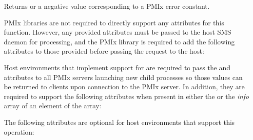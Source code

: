 Returns  or a negative value corresponding to a PMIx error constant.

\reqattrstart
\ac{PMIx} libraries are not required to directly support any attributes for this function. However, any provided attributes must be passed to the host \ac{SMS} daemon for processing, and the \ac{PMIx} library is required to add the following attributes to those provided before passing the request to the host:


\divider

Host environments that implement support for  are required to pass the  and  attributes to all \ac{PMIx} servers launching new child processes so those values can be returned to clients upon connection to the \ac{PMIx} server. In addition, they are required to support the following attributes when present in either the  or the \textit{info} array of an element of the  array:


\reqattrend

\optattrstart
The following attributes are optional for host environments that support this operation:

